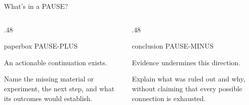 \documentclass[aspectratio=1610,11pt]{beamer}
\newcommand{\kicker}[1]{{\color{Muted}\fontsize{9}{11}\selectfont #1\par}\vspace{2mm}}
\newcommand{\takeaway}[1]{\par\vfill\noindent{\setlength{\fboxsep}{0pt}\colorbox{Rust}{\hspace*{2.4pt}%
  {\setlength{\fboxsep}{7pt}\colorbox{Warm}{\parbox{\dimexpr\linewidth-2.4pt-14pt\relax}{%
  \raggedright\fontsize{10.5}{13.5}\selectfont #1}}}}}\par}
\begin{document}
\begin{frame}[t]{What's in a PAUSE?}
\begin{columns}[T,onlytextwidth]
\begin{column}{.48\textwidth}
  \begin{beamercolorbox}[sep=9pt,wd=\linewidth]{paperbox}
    {\Large\color{Teal}PAUSE-PLUS}\par\vspace{3mm}
    An actionable continuation exists.\par\vspace{3mm}
    Name the missing material or experiment, the next step, and what its outcomes would establish.
  \end{beamercolorbox}
\end{column}
\begin{column}{.48\textwidth}
  \begin{beamercolorbox}[sep=9pt,wd=\linewidth]{conclusion}
    {\Large\color{Rust}PAUSE-MINUS}\par\vspace{3mm}
    Evidence undermines this direction.\par\vspace{3mm}
    Explain what was ruled out and why, without claiming that every possible connection is exhausted.
  \end{beamercolorbox}
\end{column}
\end{columns}
\vspace{5mm}
\end{frame}
\end{document}
